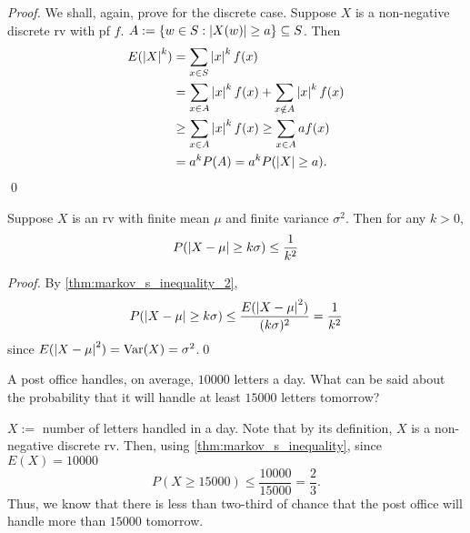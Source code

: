 \documentclass[notoc,notitlepage]{tufte-book}
\begin{document}
\begin{proof}
  We shall, again, prove for the discrete case. Suppose $X$ is a non-negative discrete rv with pf $f$. $A := \{w \in S : \left|X(w)\right| \geq a\} \subseteq S$. Then
  \begin{align*}
    E(\left|X\right|^k) &= \sum_{x \in S} \left|x\right|^k f(x) \\
                 &= \sum_{x \in A} \left|x\right|^k f(x) + \sum_{x \notin A} \left|x\right|^k f(x) \\
                 &\geq \sum_{x \in A} \left|x\right|^k f(x) \geq \sum_{x \in A} af(x) \\
                 &= a^k P(A) = a^k P(\left|X\right| \geq a).
  \end{align*}\qed
\end{proof}

\begin{thm}
\label{thm:chebyshev_s_inequality}
  Suppose $X$ is an rv with finite mean $\mu$ and finite variance $\sigma^2$. Then for any $k > 0$,
  \begin{equation}\label{eq:chebyshev_s_inequality}
    P(\left|X - \mu\right| \geq k \sigma) \leq \frac{1}{k^2}
  \end{equation}
\end{thm}

\begin{proof}
  By \cref{thm:markov_s_inequality_2},
  \begin{equation*}
    P(\left|X - \mu\right| \geq k \sigma) \leq \frac{E(\left|X - \mu\right|^2)}{(k\sigma)^2} = \frac{1}{k^2}
  \end{equation*} since $E(\left|X - \mu\right|^2) = \operatorname{Var}(X) = \sigma^2$.\qed
\end{proof}

\begin{eg}[Example 2.23]
  A post office handles, on average, $10000$ letters a day. What can be said about the probability that it will handle at least $15000$ letters tomorrow?

  \begin{solution}
    $X :=$ number of letters handled in a day. Note that by its definition, $X$ is a non-negative discrete rv. Then, using \cref{thm:markov_s_inequality}, since $E(X) = 10000$
    \begin{equation*}
      P(X \geq 15000) \leq \frac{10000}{15000} = \frac{2}{3}.
    \end{equation*}
    Thus, we know that there is less than two-third of chance that the post office will handle more than $15000$ tomorrow.
  \end{solution}
\end{eg}
\end{document}
